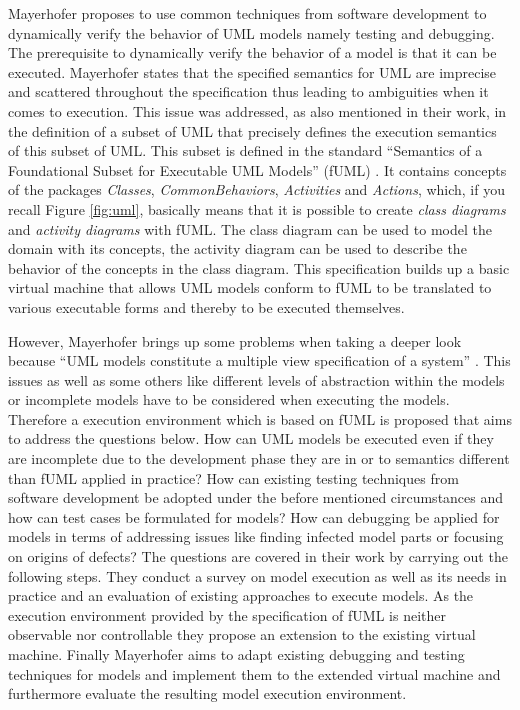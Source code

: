 \documentclass{llncs}
\begin{document}
Mayerhofer \cite{DBLP:conf/icse/Mayerhofer12} proposes to use common techniques from software development to
dynamically verify the behavior of UML models namely testing and debugging. The prerequisite to dynamically 
verify the behavior of a model is that it can be executed. Mayerhofer states that the specified semantics for 
UML are imprecise and scattered throughout the specification thus leading to ambiguities when it comes to execution. 
This issue was addressed, as also mentioned in their work, in
the definition of a subset of UML that precisely defines the execution semantics of this subset of UML. This
subset is defined in the standard ``Semantics of a Foundational Subset for Executable UML Models'' (fUML) 
\cite{man:FUML}. It contains concepts of the packages \textit{Classes}, \textit{CommonBehaviors}, \textit{Activities} and \textit{Actions}, which, 
if you recall Figure \ref{fig:uml},  basically means that it is possible to create 
\textit{class diagrams} and \textit{activity diagrams} with fUML. The class diagram can be used to model the domain with its concepts, the activity diagram can be used
to describe the behavior of the concepts in the class diagram. This specification builds up a basic virtual machine 
that allows UML models conform to fUML to be translated to various executable forms and thereby to be executed themselves.

However, Mayerhofer brings up some problems when
taking a deeper look because ``UML models constitute a multiple view specification of a system'' \cite{DBLP:conf/icse/Mayerhofer12}.
This issues as well as some others like different levels of abstraction within the models or incomplete models have to be 
considered when executing the models. Therefore a execution environment which is based on fUML is proposed that aims to address 
the questions below. How can UML models be executed even if they are incomplete due to the development phase they are in or 
to semantics different than fUML applied in practice? How can existing testing techniques from software development be adopted 
under the before mentioned circumstances and how can test cases be formulated for models? How can debugging be applied for 
models in terms of addressing issues like finding infected model parts or focusing on origins of defects? The questions are 
covered in their work by carrying out the following steps. They conduct a survey on model execution as well as its needs in 
practice and an evaluation of existing approaches to execute models. As the execution environment provided by the specification 
of fUML is neither observable nor controllable they propose an extension to the existing virtual machine. Finally Mayerhofer 
aims to adapt existing debugging and testing techniques for models and implement them to the extended virtual machine and 
furthermore evaluate the resulting model execution environment.
\end{document}
